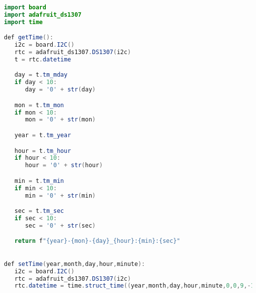 \begin{lstlisting}[language=Java]
import board
import adafruit_ds1307
import time 

def getTime():
   i2c = board.I2C()
   rtc = adafruit_ds1307.DS1307(i2c)
   t = rtc.datetime

   day = t.tm_mday
   if day < 10:
      day = '0' + str(day)

   mon = t.tm_mon
   if mon < 10:
      mon = '0' + str(mon)

   year = t.tm_year

   hour = t.tm_hour
   if hour < 10:
      hour = '0' + str(hour)

   min = t.tm_min
   if min < 10:
      min = '0' + str(min)

   sec = t.tm_sec
   if sec < 10:
      sec = '0' + str(sec)

   return f"{year}-{mon}-{day}_{hour}:{min}:{sec}"

   
def setTime(year,month,day,hour,minute):
   i2c = board.I2C()
   rtc = adafruit_ds1307.DS1307(i2c)
   rtc.datetime = time.struct_time((year,month,day,hour,minute,0,0,9,-1))
        

\end{lstlisting}


